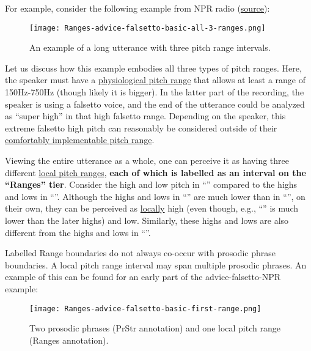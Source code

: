 For example, consider the following example from NPR radio (\href{https://www.npr.org/sections/goatsandsoda/2018/05/11/603315432/the-best-mothers-day-gift-get-mom-out-of-the-box}{source}):

\begin{figure}[H]
\centering
%
\texttt{[image: Ranges-advice-falsetto-basic-all-3-ranges.png]}
%
\caption{An example of a long utterance with three pitch range intervals.%
\label{fig:advice-falsetto Ranges basic}%
%
}
\end{figure}

Let us discuss how this example embodies all three types of pitch ranges. Here, the speaker must have a \uline{physiological pitch range} that allows at least a range of 150Hz-750Hz (though likely it is bigger). In the latter part of the recording, the speaker is using a falsetto voice, and the end of the utterance could be analyzed as “super high” in that high falsetto range. Depending on the speaker, this extreme falsetto high pitch can reasonably be considered outside of their \uline{comfortably implementable pitch range}.

Viewing the entire utterance as a whole, one can perceive it as having three different \uline{local pitch ranges}, \textbf{each of which is labelled as an interval on the “Ranges” tier}. Consider the high and low pitch in “” compared to the highs and lows in “”. Although the highs and lows in “” are much lower than in “”, on their own, they can be perceived as \uline{locally} high (even though, e.g., “” is much lower than the later highs) and low. Similarly, these highs and lows are also different from the highs and lows in “”.

Labelled Range boundaries do not always co-occur with prosodic phrase boundaries. A local pitch range interval may span multiple prosodic phrases. An example of this can be found for an early part of the advice-falsetto-NPR example:

\begin{figure}[H]
\centering
%
\texttt{[image: Ranges-advice-falsetto-basic-first-range.png]}
%
\caption{Two prosodic phrases (PrStr annotation) and one local pitch range (Ranges annotation).%
\label{fig:advice-falsetto PrStr Ranges basic}%
%
%
}
\end{figure}

